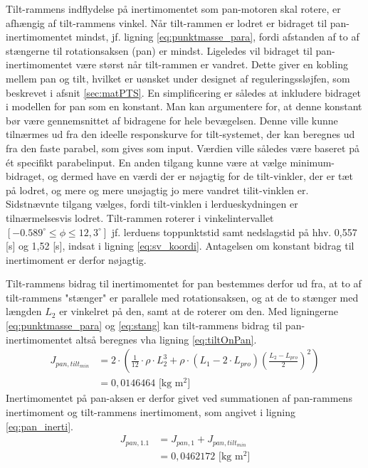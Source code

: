 Tilt-rammens indflydelse på inertimomentet som pan-motoren skal rotere, er afhængig af tilt-rammens vinkel.
Når tilt-rammen er lodret er bidraget til pan-inertimomentet mindst, jf. ligning \ref{eq:punktmasse_para}, fordi afstanden
af to af stængerne til rotationsaksen (pan) er mindst. Ligeledes vil bidraget til pan-inertimomentet være størst når tilt-rammen er vandret.
Dette giver en kobling mellem pan og tilt, hvilket er uønsket under designet af reguleringssløjfen, som beskrevet i afsnit \ref{sec:matPTS}.
En simplificering er således at inkludere bidraget i modellen for pan som en konstant.
Man kan argumentere for, at denne konstant bør være gennemsnittet af bidragene for hele bevægelsen.
Denne ville kunne tilnærmes ud fra den ideelle responskurve for tilt-systemet, der kan beregnes ud fra den faste parabel, som gives som input.
Værdien ville således være baseret på ét specifikt parabelinput. En anden tilgang kunne være at vælge minimum-bidraget, og dermed
have en værdi der er nøjagtig for de tilt-vinkler, der er tæt på lodret, og mere og mere unøjagtig jo mere vandret tilit-vinklen er.
Sidstnævnte tilgang vælges, fordi tilt-vinklen i lerdueskydningen er tilnærmelsesvis lodret. Tilt-rammen roterer i vinkelintervallet \([-0.589^{\circ} \leq \phi \leq 12,3^{\circ}]\) jf. lerduens toppunktstid samt nedslagstid på hhv. 0,557 [s] og 1,52 [s], indsat i ligning \ref{eq:sv_koordi}. Antagelsen om konstant bidrag til inertimoment er derfor nøjagtig.

Tilt-rammens bidrag til inertimomentet for pan bestemmes derfor ud fra, at to af tilt-rammens "stænger" er parallele med
rotationsaksen, og at de to stænger med længden \({L_{2}}\) er vinkelret på den, samt at de roterer om den.
Med ligningerne \ref{eq:punktmasse_para} og \ref{eq:stang}
kan tilt-rammens bidrag til pan-inertimomentet altså beregnes vha ligning \ref{eq:tiltOnPan}.
\begin{align}
J_{pan,tilt_{min}}&=2\cdot{}\left(\frac{1}{12}\cdot{}\rho\cdot{}L_{2}^3
+\rho\cdot{}\left(L_1-2\cdot{}L_{pro}\right)\left(\frac{L_2-L_{pro}}{2}\right)^2\right)
\\
&=0,0146464 \text{ [kg m$^2$]}
\label{eq:tiltOnPan} 
\end{align}
Inertimomentet på pan-aksen er derfor givet ved summationen af pan-rammens inertimoment og tilt-rammens inertimoment,
som angivet i ligning \ref{eq:pan_inerti}.
\begin{align}
{ J }_{ pan,1.1 } &= J_{ pan,1 }+J_ { pan,tilt_{ min} }
\\&=0,0462172 \text{ [kg m$^2$]}
\label{eq:pan_inerti} 
\end{align}

